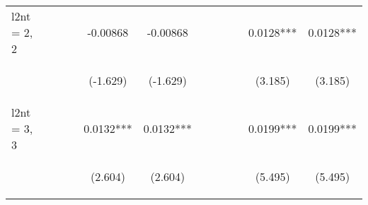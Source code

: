 \documentclass[]{article}
\begin{document}
\begin{center}
\begin{tabular}{lccccccccccc}
l2nt = 2, 2 &  &  &  & -0.00868 & -0.00868 &  &  &  &  & 0.0128*** & 0.0128*** \\
\vspace{4pt} & \begin{footnotesize}\end{footnotesize} & \begin{footnotesize}\end{footnotesize} & \begin{footnotesize}\end{footnotesize} & \begin{footnotesize}(-1.629)\end{footnotesize} & \begin{footnotesize}(-1.629)\end{footnotesize} & \begin{footnotesize}\end{footnotesize} & \begin{footnotesize}\end{footnotesize} & \begin{footnotesize}\end{footnotesize} & \begin{footnotesize}\end{footnotesize} & \begin{footnotesize}(3.185)\end{footnotesize} & \begin{footnotesize}(3.185)\end{footnotesize} \\
l2nt = 3, 3 &  &  &  & 0.0132*** & 0.0132*** &  &  &  &  & 0.0199*** & 0.0199*** \\
\vspace{4pt} & \begin{footnotesize}\end{footnotesize} & \begin{footnotesize}\end{footnotesize} & \begin{footnotesize}\end{footnotesize} & \begin{footnotesize}(2.604)\end{footnotesize} & \begin{footnotesize}(2.604)\end{footnotesize} & \begin{footnotesize}\end{footnotesize} & \begin{footnotesize}\end{footnotesize} & \begin{footnotesize}\end{footnotesize} & \begin{footnotesize}\end{footnotesize} & \begin{footnotesize}(5.495)\end{footnotesize} & \begin{footnotesize}(5.495)\end{footnotesize} \\

\end{tabular}
\end{center}
\end{document}
